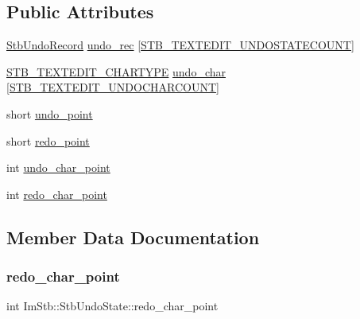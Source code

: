 \subsection*{Public Attributes}
\begin{DoxyCompactItemize}
\item 
\hyperlink{structImStb_1_1StbUndoRecord}{Stb\+Undo\+Record} \hyperlink{structImStb_1_1StbUndoState_a0cac31054133ca474b349647e74b8edc}{undo\+\_\+rec} \mbox{[}\hyperlink{imstb__textedit_8h_afa79483143df87a1497010712b3dfaf9}{S\+T\+B\+\_\+\+T\+E\+X\+T\+E\+D\+I\+T\+\_\+\+U\+N\+D\+O\+S\+T\+A\+T\+E\+C\+O\+U\+NT}\mbox{]}
\item 
\hyperlink{imstb__textedit_8h_a6e64031a061922e3a48d88fd8623f4c3}{S\+T\+B\+\_\+\+T\+E\+X\+T\+E\+D\+I\+T\+\_\+\+C\+H\+A\+R\+T\+Y\+PE} \hyperlink{structImStb_1_1StbUndoState_a244b386e1412da6b8ab87a952d01f4f7}{undo\+\_\+char} \mbox{[}\hyperlink{imstb__textedit_8h_a15cbcac55cf92003c28c44734422756a}{S\+T\+B\+\_\+\+T\+E\+X\+T\+E\+D\+I\+T\+\_\+\+U\+N\+D\+O\+C\+H\+A\+R\+C\+O\+U\+NT}\mbox{]}
\item 
short \hyperlink{structImStb_1_1StbUndoState_a2c4fd577dd35315aeade038ea01f3bff}{undo\+\_\+point}
\item 
short \hyperlink{structImStb_1_1StbUndoState_a0f2146b1a6ab1419283b376c7506a001}{redo\+\_\+point}
\item 
int \hyperlink{structImStb_1_1StbUndoState_a5821d093de03804669009f6fdfadff5b}{undo\+\_\+char\+\_\+point}
\item 
int \hyperlink{structImStb_1_1StbUndoState_a66518921e877f0ffc472dc44a46e538a}{redo\+\_\+char\+\_\+point}
\end{DoxyCompactItemize}


\subsection{Member Data Documentation}
\mbox{\label{structImStb_1_1StbUndoState_a66518921e877f0ffc472dc44a46e538a}} 
\subsubsection{\texorpdfstring{redo\+\_\+char\+\_\+point}{redo\_char\_point}}
{\footnotesize\ttfamily int Im\+Stb\+::\+Stb\+Undo\+State\+::redo\+\_\+char\+\_\+point}

